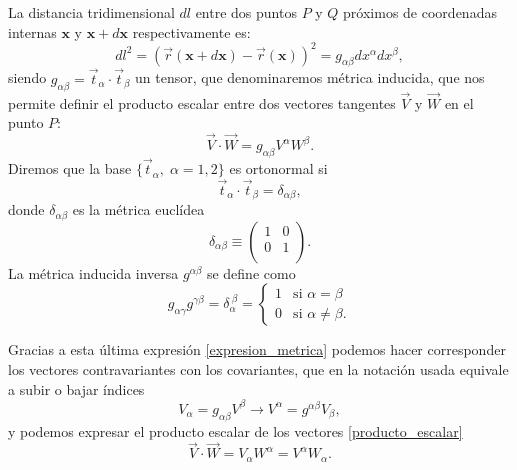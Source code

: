 La distancia tridimensional $dl$ entre dos puntos $P$ y $Q$ próximos de coordenadas internas
$\mathbf{x}$ y $\mathbf{x}+d\mathbf{x}$ respectivamente es:
\begin{equation}\label{elemento_linea}
dl^2=(\vec{r}(\mathbf{x}+d\mathbf{x})-\vec{r}(\mathbf{x}))^2=g_{\alpha\beta}dx^{\alpha}dx^{\beta},
\end{equation}
siendo $g_{\alpha\beta}=\vec{t}_{\alpha}\cdot\vec{t}_{\beta}$ un tensor, que
denominaremos métrica inducida, que nos permite definir el producto escalar
entre dos vectores tangentes $\vec{V}$ y $\vec{W}$ en el punto $P$:
\begin{equation}\label{producto_escalar}
\vec{V}\cdot\vec{W}=g_{\alpha\beta}V^{\alpha}W^{\beta}.
\end{equation}
Diremos que la base $\{ \vec{t}_{\alpha},\; \alpha=1,2\}$ es ortonormal si
\begin{equation*}
\vec{t}_{\alpha}\cdot\vec{t}_{\beta}=\delta_{\alpha\beta},
\end{equation*}
donde $\delta_{\alpha\beta}$ es la métrica euclídea 
\begin{equation*}
\delta_{\alpha\beta}\equiv\left(\begin{array}{cc}
1&0\\
0&1\\
\end{array}\right).
\end{equation*}
La métrica inducida inversa $g^{\alpha\beta}$ se define como
\begin{equation}\label{expresion_metrica}
g_{\alpha\gamma}g^{\gamma\beta}=\delta_{\alpha}^{\ \beta}=\begin{cases}
1&\text{si $\alpha=\beta$}\\
0&\text{si $\alpha\neq\beta$}.
\end{cases}
\end{equation}

Gracias a esta última expresión \eqref{expresion_metrica} podemos hacer
corresponder los vectores contravariantes con los covariantes, que en la
notación usada equivale a subir o bajar índices
\begin{equation*}
V_{\alpha}=g_{\alpha\beta}V^{\beta}\rightarrow V^{\alpha}=g^{\alpha\beta}V_{\beta}, 
\end{equation*}
y podemos expresar el producto escalar de los vectores
\eqref{producto_escalar} 
\begin{equation*}
\vec{V}\cdot\vec{W}=V_{\alpha}W^{\alpha}=V^{\alpha}W_{\alpha}.
\end{equation*}

